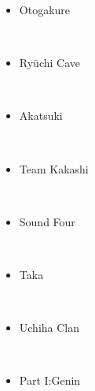 \documentclass[a4paper,12pt]{article}
\begin{document}
\begin{itemize}
\item Otogakure
\end{itemize}\\ \par \vspace{0.5cm}

\begin{itemize}
\item Ryūchi Cave
\end{itemize}\\ \par \vspace{0.5cm}

\begin{itemize}
\item Akatsuki
\end{itemize}\\ \par \vspace{0.5cm}

\begin{itemize}
\item Team Kakashi
\end{itemize}\\ \par \vspace{0.5cm}

\begin{itemize}
\item Sound Four
\end{itemize}\\ \par \vspace{0.5cm}

\begin{itemize}
\item Taka
\end{itemize}\\ \par \vspace{0.5cm}

\begin{itemize}
\item Uchiha Clan
\end{itemize}\\ \par \vspace{0.5cm}

\begin{itemize}
\item Part I:Genin
\end{itemize}\\ \par \vspace{0.5cm}
\end{document}
